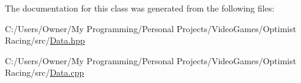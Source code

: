The documentation for this class was generated from the following files\-:\begin{DoxyCompactItemize}
\item 
C\-:/\-Users/\-Owner/\-My Programming/\-Personal Projects/\-Video\-Games/\-Optimist Racing/src/\hyperlink{_data_8hpp}{Data.\-hpp}\item 
C\-:/\-Users/\-Owner/\-My Programming/\-Personal Projects/\-Video\-Games/\-Optimist Racing/src/\hyperlink{_data_8cpp}{Data.\-cpp}\end{DoxyCompactItemize}

